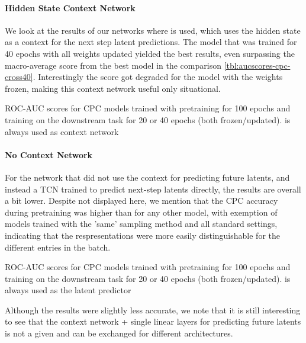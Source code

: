 \paragraph{Hidden State Context Network}
We look at the results of our networks where  is used, which uses the hidden state as a context for the next step latent predictions. The model that was trained for 40 epochs with all weights updated yielded the best results, even surpassing the macro-average score from the best model in the comparison \autoref{tbl:aucscores-cpc-cross40}. Interestingly the score got degraded for the model with the weights frozen, making this context network useful only situational.
\begin{table}\centering
	\resizebox{\textwidth}{!}{
		
	}
	\caption*{\small ROC-AUC scores for CPC models trained with pretraining for 100 epochs and training on the downstream task for 20 or 40 epochs (both frozen/updated).  is always used as context network}
	\label{tbl:aucscores-cpc-hidden}
\end{table}

\paragraph{No Context Network}
For the network that did not use the context for predicting future latents, and instead a TCN trained to predict next-step latents directly, the results are overall a bit lower. Despite not displayed here, we mention that the CPC accuracy during pretraining was higher than for any other model, with exemption of models trained with the 'same' sampling method and all standard settings, indicating that the respresentations were more easily distinguishable for the different entries in the batch.
\begin{table}[h]\centering
	\resizebox{\textwidth}{!}{
		
	}
	\caption*{\small ROC-AUC scores for CPC models trained with pretraining for 100 epochs and training on the downstream task for 20 or 40 epochs (both frozen/updated).  is always used as the latent predictor}
	\label{tbl:aucscores-cpc-nocontext}
\end{table}
Although the results were slightly less accurate, we note that it is still interesting to see that the context network + single linear layers for predicting future latents is not a given and can be exchanged for different architectures.

